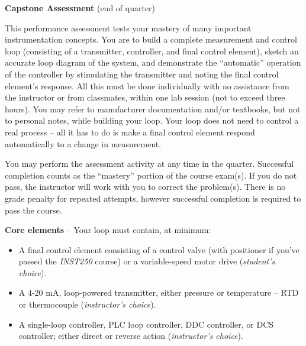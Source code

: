 

\noindent
{\bf Capstone Assessment} (end of quarter)

\vskip 10pt

This performance assessment tests your mastery of many important instrumentation concepts.  You are to build a complete measurement and control loop (consisting of a transmitter, controller, and final control element), sketch an accurate loop diagram of the system, and demonstrate the ``automatic'' operation of the controller by stimulating the transmitter and noting the final control element's response.  All this must be done individually with no assistance from the instructor or from classmates, within one lab session (not to exceed three hours).  You may refer to manufacturer documentation and/or textbooks, but not to personal notes, while building your loop.  Your loop does not need to control a real process -- all it has to do is make a final control element respond automatically to a change in measurement.

You may perform the assessment activity at any time in the quarter.  Successful completion counts as the ``mastery'' portion of the course exam(s).  If you do not pass, the instructor will work with you to correct the problem(s).  There is no grade penalty for repeated attempts, however successful completion is required to pass the course.

\vskip 10pt

\noindent
{\bf Core elements} -- Your loop must contain, at minimum:

\begin{itemize}
\item{} A final control element consisting of a control valve (with positioner if you've passed the {\it INST250} course) or a variable-speed motor drive ({\it student's choice}).
\vskip 5pt
\item{} A 4-20 mA, loop-powered transmitter, either pressure or temperature -- RTD or thermocouple ({\it instructor's choice}).
\vskip 5pt
\item{} A single-loop controller, PLC loop controller, DDC controller, or DCS controller; either direct or reverse action ({\it instructor's choice}).
\end{itemize}

\vskip 10pt

